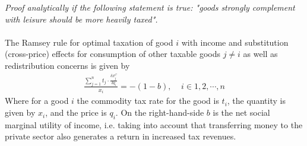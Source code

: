 \textit{Proof analytically if the following statement is true: "goods strongly complement with
leisure should be more heavily taxed".}
\\
\\
The Ramsey rule for optimal taxation of good $i$ with income and substitution (cross-price) effects for consumption of other taxable goods $j\neq i$ as well as redistribution concerns is given by
\begin{align}
  \frac{\sum\limits_{j=1}^n t_j\cdot \frac{\delta x_j^C}{\delta q_i}}{x_i}=-(1-b),\ \ \ \ \ i\in 1,2,\cdots,n \label{eq_ramsey}
\end{align}
Where for a good $i$ the commodity tax rate for the good is $t_i$, the quantity is given by $x_i$, and the price is $q_i$. On the right-hand-side $b$ is the net social marginal utility of income, i.e. taking into account that transferring money to the private sector also generates a return in increased tax revenues.

